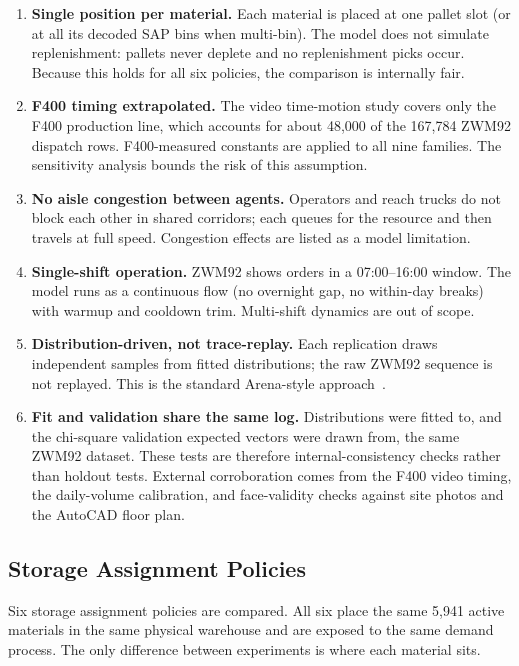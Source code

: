 \begin{enumerate}
  \item \textbf{Single position per material.} Each material is placed at
        one pallet slot (or at all its decoded SAP bins when multi-bin). The
        model does not simulate replenishment: pallets never deplete and no
        replenishment picks occur. Because this holds for all six policies,
        the comparison is internally fair.
  \item \textbf{F400 timing extrapolated.} The video time-motion study
        covers only the F400 production line, which accounts for about 48,000
        of the 167,784 ZWM92 dispatch rows. F400-measured constants are
        applied to all nine families. The sensitivity analysis bounds the
        risk of this assumption.
  \item \textbf{No aisle congestion between agents.} Operators and reach
        trucks do not block each other in shared corridors; each queues for
        the resource and then travels at full speed. Congestion effects are
        listed as a model limitation.
  \item \textbf{Single-shift operation.} ZWM92 shows orders in a
        07:00--16:00 window. The model runs as a continuous flow (no
        overnight gap, no within-day breaks) with warmup and cooldown trim.
        Multi-shift dynamics are out of scope.
  \item \textbf{Distribution-driven, not trace-replay.} Each replication
        draws independent samples from fitted distributions; the raw ZWM92
        sequence is not replayed. This is the standard Arena-style
        approach~\cite{law2015}.
  \item \textbf{Fit and validation share the same log.} Distributions were
        fitted to, and the chi-square validation expected vectors were drawn
        from, the same ZWM92 dataset. These tests are therefore
        internal-consistency checks rather than holdout tests. External
        corroboration comes from the F400 video timing, the daily-volume
        calibration, and face-validity checks against site photos and the
        AutoCAD floor plan.
\end{enumerate}


\subsection{Storage Assignment Policies}\label{sec:policies}

Six storage assignment policies are compared. All six place the same 5,941
active materials in the same physical warehouse and are exposed to the same
demand process. The only difference between experiments is where each
material sits.

